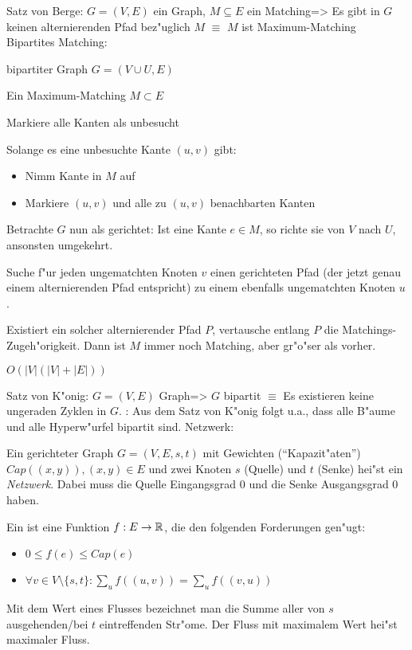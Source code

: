 \theorem Satz von Berge:
  $G=(V,E)$ ein Graph, $M\subseteq E$ ein Matching=>
{
  Es gibt in $G$ keinen alternierenden Pfad bez"uglich $M$ 
  $\equiv$ $M$ ist Maximum-Matching
}
\algorithm Bipartites Matching:{
  \given bipartiter Graph $G=(V\cup U,E)$
  
  \aim Ein Maximum-Matching $M\subset E$
  
  \begin{proc}
    \item Markiere alle Kanten als unbesucht
    \item Solange es eine unbesuchte Kante $(u,v)$ gibt:
      \begin{itemize}
        \item Nimm Kante in $M$ auf
        \item Markiere $(u,v)$ und alle zu $(u,v)$ benachbarten Kanten
      \end{itemize}
    \item Betrachte $G$ nun als gerichtet: Ist eine Kante $e\in M$,
      so richte sie von $V$ nach $U$, ansonsten umgekehrt.
    \item Suche f"ur jeden ungematchten Knoten $v$ einen
      gerichteten Pfad (der jetzt genau einem alternierenden Pfad entspricht)
      zu einem ebenfalls ungematchten Knoten $u$.
      
      Existiert ein solcher alternierender Pfad $P$, vertausche entlang $P$
      die Matchings-Zugeh"origkeit. Dann ist $M$ immer noch Matching, aber
      gr"o"ser als vorher.
  \end{proc}
  
  \cpx $O(|V|(|V|+|E|))$
}
\theorem Satz von K"onig:
  $G=(V,E)$ Graph=>
{
  $G$ bipartit $\equiv$ Es existieren keine ungeraden Zyklen in $G$.
}
\remark:{
  Aus dem Satz von K"onig folgt u.a., dass alle B"aume und alle 
  Hyperw"urfel bipartit sind.
}
 Netzwerk:{
  Ein gerichteter Graph $G=(V,E,s,t)$ mit Gewichten (``Kapazit"aten'') 
  $Cap((x,y)),(x,y)\in E$ und zwei Knoten $s$ (Quelle) und $t$ (Senke) 
  hei"st ein \textit{Netzwerk}. Dabei muss die Quelle Eingangsgrad 0 und
  die Senke Ausgangsgrad 0 haben.
  
  Ein \textit{} ist eine Funktion $f:E\to\mathbb R$, die
  den folgenden Forderungen gen"ugt:
  \begin{itemize}
    \item $0\le f(e) \le Cap(e)$
    \item $\forall v\in V\setminus\{s,t\}: \sum_u f((u,v)) = \sum_u f((v,u))$
  \end{itemize}
  Mit dem Wert eines Flusses bezeichnet man die Summe aller von 
  $s$ ausgehenden/bei $t$ eintreffenden Str"ome. Der Fluss mit
  maximalem Wert hei"st maximaler Fluss.
}
